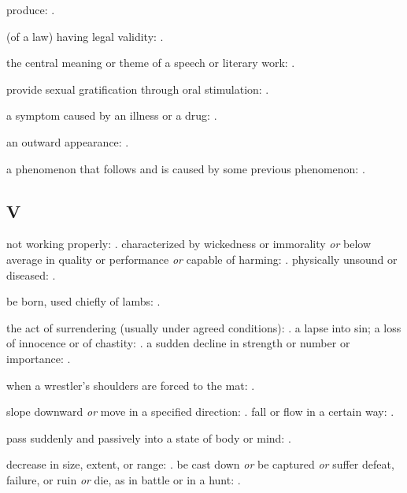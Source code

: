   produce:   .

  (of a law) having legal validity:   .

  the central meaning or theme of a speech or literary work:   .

  provide sexual gratification through oral stimulation:   .

  a symptom caused by an illness or a drug: .

  an outward appearance:   .

  a phenomenon that follows and is caused by some previous phenomenon:   .

\subsection*{V}

  not working properly:   . characterized by wickedness or immorality \textit{or} below average in quality or performance \textit{or} capable of harming: . physically unsound or diseased:   .

  be born, used chiefly of lambs: .

  the act of surrendering (usually under agreed conditions):   . a lapse into sin; a loss of innocence or of chastity: . a sudden decline in strength or number or importance:   .

  when a wrestler's shoulders are forced to the mat:   .

  slope downward \textit{or} move in a specified direction: . fall or flow in a certain way:   .

  pass suddenly and passively into a state of body or mind: .

  decrease in size, extent, or range:   . be cast down \textit{or} be captured \textit{or} suffer defeat, failure, or ruin \textit{or} die, as in battle or in a hunt: .

